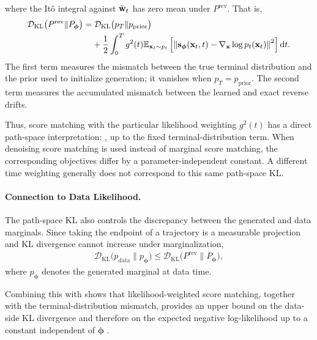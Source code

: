 where the It\^o integral against $\bar{{\mathbf{w}}}_t$ has zero mean under $P^{\mathrm{rev}}$. That is,
\endgroup
\begin{align}\label{eq:girsanov-KL}
\begin{aligned}
\mathcal{D}_{\mathrm{KL}}
\bigl(P^{\mathrm{rev}}\|P_{\bm{\phi}}\bigr)
=
&\;
\mathcal{D}_{\mathrm{KL}}
\bigl(p_T\|p_{\mathrm{prior}}\bigr)
\\
&+
\frac{1}{2}
\int_0^T
g^2(t)
\mathbb{E}_{{\mathbf{x}}_t\sim p_t}
\left[
\left\|
{\mathbf{s}}_{\bm{\phi}}({\mathbf{x}}_t,t)
-
\nabla_{{\mathbf{x}}}\log p_t({\mathbf{x}}_t)
\right\|^2
\right]
\mathop{}\!\mathrm{d} t .
\end{aligned}
\end{align}
The first term measures the mismatch between the true terminal distribution
and the prior used to initialize generation; it vanishes when
$p_T=p_{\mathrm{prior}}$. The second term measures the accumulated mismatch
between the learned and exact reverse drifts.

Thus, score matching with the particular likelihood weighting $g^2(t)$
has a direct path-space interpretation: ,
up to the fixed terminal-distribution term. When denoising score matching is
used instead of marginal score matching, the corresponding objectives differ
by a parameter-independent constant. A different time weighting generally
does not correspond to this same path-space KL.

\paragraph{Connection to Data Likelihood.}
The path-space KL also controls the discrepancy between the generated and
data marginals. Since taking the endpoint of a trajectory is a measurable
projection and KL divergence cannot increase under marginalization,
\begin{align}\label{eq:girsanov-likelihood}
\mathcal{D}_{\mathrm{KL}}
\bigl(p_{\mathrm{data}}\|p_{\bm{\phi}}\bigr)
\leq
\mathcal{D}_{\mathrm{KL}}
\bigl(P^{\mathrm{rev}}\|P_{\bm{\phi}}\bigr),
\end{align}
where $p_{\bm{\phi}}$ denotes the generated marginal at data time.

Combining this with  shows that likelihood-weighted
score matching, together with the terminal-distribution mismatch, provides
an upper bound on the data-side KL divergence and therefore on the expected
negative log-likelihood up to a constant independent of $\bm{\phi}$
\citep{song2021maximum}.